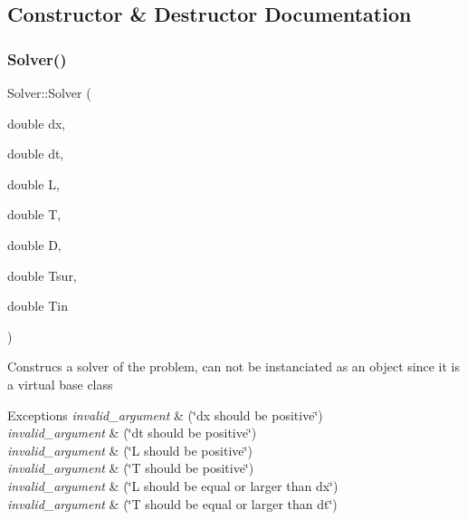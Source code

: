 \subsection{Constructor \& Destructor Documentation}
\mbox{\label{classSolver_a3a1edb79e38781d40e5be114c7a549ba}} 
\subsubsection{\texorpdfstring{Solver()}{Solver()}}
{\footnotesize\ttfamily Solver\+::\+Solver (\begin{DoxyParamCaption}\item[{double}]{dx,  }\item[{double}]{dt,  }\item[{double}]{L,  }\item[{double}]{T,  }\item[{double}]{D,  }\item[{double}]{Tsur,  }\item[{double}]{Tin }\end{DoxyParamCaption})}

Construcs a solver of the problem, can not be instanciated as an object since it is a virtual base class 
\begin{DoxyExceptions}{Exceptions}
{\em invalid\+\_\+argument} & (\char`\"{}dx should be positive\char`\"{}) \\
\hline
{\em invalid\+\_\+argument} & (\char`\"{}dt should be positive\char`\"{}) \\
\hline
{\em invalid\+\_\+argument} & (\char`\"{}\+L should be positive\char`\"{}) \\
\hline
{\em invalid\+\_\+argument} & (\char`\"{}\+T should be positive\char`\"{}) \\
\hline
{\em invalid\+\_\+argument} & (\char`\"{}\+L should be equal or larger than dx\char`\"{}) \\
\hline
{\em invalid\+\_\+argument} & (\char`\"{}\+T should be equal or larger than dt\char`\"{}) \\
\hline
\end{DoxyExceptions}

